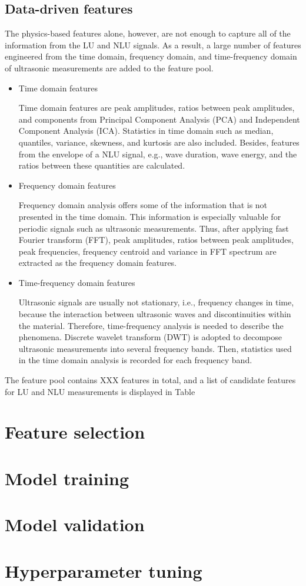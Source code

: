 \subsection{Data-driven features}
The physics-based features alone, however, are not enough to capture all of the information from the LU and NLU signals. As a result, a large number of features engineered from the time domain, frequency domain, and time-frequency domain of ultrasonic measurements are added to the feature pool.

\begin{itemize}
    \item Time domain features
    
    Time domain features are peak amplitudes, ratios between peak amplitudes, and components from Principal Component Analysis (PCA) and Independent Component Analysis (ICA). Statistics in time domain such as median, quantiles, variance, skewness, and kurtosis are also included. Besides, features from the envelope of a NLU signal, e.g., wave duration, wave energy, and the ratios between these quantities are calculated.

    \item Frequency domain features
    
    Frequency domain analysis offers some of the information that is not presented in the time domain. This information is especially valuable for periodic signals such as ultrasonic measurements. Thus, after applying fast Fourier transform (FFT), peak amplitudes, ratios between peak amplitudes, peak frequencies, frequency centroid and variance in FFT spectrum are extracted as the frequency domain features.

    \item Time-frequency domain features
    
    Ultrasonic signals are usually not stationary, i.e., frequency changes in time, because the interaction between ultrasonic waves and discontinuities within the material. Therefore, time-frequency analysis is needed to describe the phenomena. Discrete wavelet transform (DWT) is adopted to decompose ultrasonic measurements into several frequency bands. Then, statistics used in the time domain analysis is recorded for each frequency band.
\end{itemize}

The feature pool contains XXX features in total, and a list of candidate features for LU and NLU measurements is displayed in Table

\section{Feature selection}
\section{Model training}
\section{Model validation}
\section{Hyperparameter tuning}
